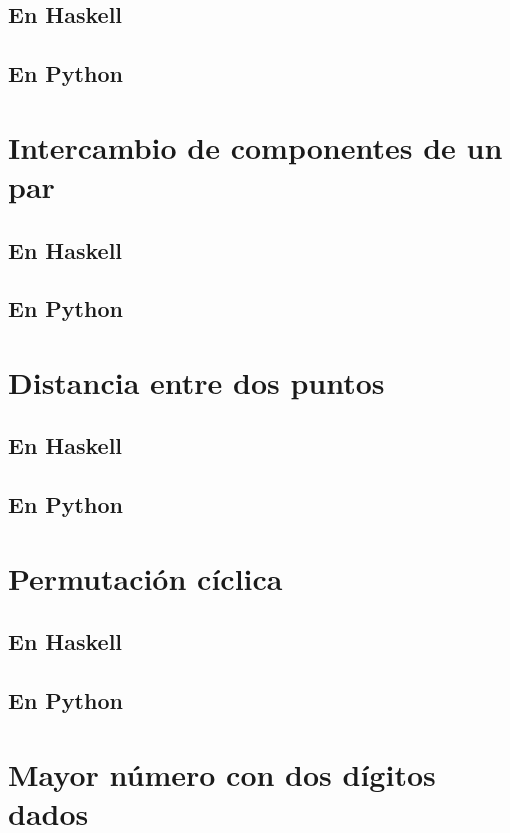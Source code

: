 \documentclass[a4paper,12pt,twoside]{book}
\begin{document}
\subsection*{En Haskell}
\subsection*{En Python}

\section{Intercambio de componentes de un par}
\subsection*{En Haskell}
\subsection*{En Python}

\section{Distancia entre dos puntos}
\subsection*{En Haskell}
\subsection*{En Python}

\section{Permutación cíclica}
\subsection*{En Haskell}
\subsection*{En Python}

\section{Mayor número con dos dígitos dados}
\end{document}
